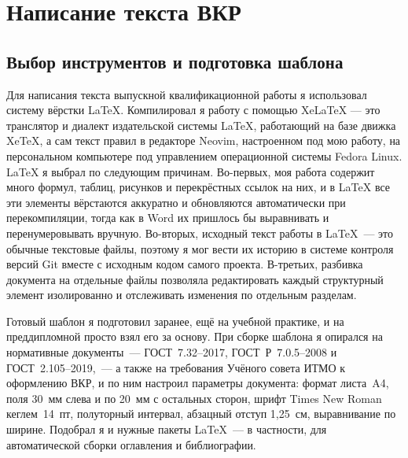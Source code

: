 
\section{Написание текста ВКР}

\subsection{Выбор инструментов и подготовка шаблона}

Для написания текста выпускной квалификационной работы я использовал
систему вёрстки \LaTeX{}.
Компилировал я работу с помощью XeLaTeX --- это транслятор и диалект издательской системы
\LaTeX{}, работающий на базе движка XeTeX, а сам текст правил в редакторе
Neovim, настроенном под мою работу, на персональном компьютере под
управлением операционной системы Fedora Linux. \LaTeX{} я выбрал по
следующим причинам. Во-первых, моя работа содержит много формул, таблиц,
рисунков и перекрёстных ссылок на них, и в \LaTeX{} все эти элементы
вёрстаются аккуратно и обновляются автоматически при перекомпиляции,
тогда как в Word их пришлось бы выравнивать и перенумеровывать вручную.
Во-вторых, исходный текст работы в \LaTeX{}~--- это обычные текстовые
файлы, поэтому я мог вести их историю в системе контроля версий Git
вместе с исходным кодом самого проекта. В-третьих, разбивка документа на
отдельные файлы позволяла редактировать каждый структурный элемент
изолированно и отслеживать изменения по отдельным разделам.

Готовый шаблон я подготовил заранее, ещё на учебной практике, и на
преддипломной просто взял его за основу. При сборке шаблона я опирался
на нормативные документы~--- ГОСТ~7.32--2017, ГОСТ~Р~7.0.5--2008 и
ГОСТ~2.105--2019,~--- а также на требования Учёного совета ИТМО к
оформлению ВКР, и по ним настроил параметры документа: формат листа~A4,
поля 30~мм слева и по 20~мм с остальных сторон, шрифт Times New Roman
кеглем~14~пт, полуторный интервал, абзацный отступ 1,25~см, выравнивание
по ширине. Подобрал я и нужные пакеты \LaTeX{}~--- в частности, для
автоматической сборки оглавления и библиографии.

